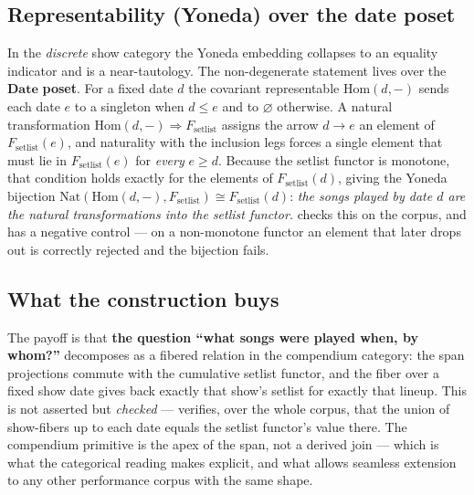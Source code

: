 \documentclass[
]{article}
\begin{document}
\subsection{Representability (Yoneda) over the date
poset}\label{representability-yoneda-over-the-date-poset}

In the \emph{discrete} show category the Yoneda embedding collapses to
an equality indicator and is a near-tautology. The non-degenerate
statement lives over the \(\mathbf{Date}\) \textbf{poset}. For a fixed
date \(d\) the covariant representable \(\mathrm{Hom}(d, -)\) sends each
date \(e\) to a singleton when \(d \le e\) and to \(\varnothing\)
otherwise. A natural transformation
\(\mathrm{Hom}(d, -) \Rightarrow F_{\text{setlist}}\) assigns the arrow
\(d \to e\) an element of \(F_{\text{setlist}}(e)\), and naturality with
the inclusion legs forces a single element that must lie in
\(F_{\text{setlist}}(e)\) for \emph{every} \(e \ge d\). Because the
setlist functor is monotone, that condition holds exactly for the
elements of \(F_{\text{setlist}}(d)\), giving the Yoneda bijection
\(\mathrm{Nat}(\mathrm{Hom}(d, -), F_{\text{setlist}}) \cong F_{\text{setlist}}(d)\):
\emph{the songs played by date \(d\) are the natural transformations
into the setlist functor.}
 checks
this on the corpus, and  has a negative
control --- on a non-monotone functor an element that later drops out is
correctly rejected and the bijection fails.

\subsection{What the construction
buys}\label{what-the-construction-buys}

The payoff is that \textbf{the question ``what songs were played when,
by whom?''} decomposes as a fibered relation in the compendium category:
the span projections commute with the cumulative setlist functor, and
the fiber over a fixed show date gives back exactly that show's setlist
for exactly that lineup. This is not asserted but \emph{checked} ---
verifies, over the whole corpus, that the union of show-fibers up to
each date equals the setlist functor's value there. The compendium
primitive is the apex of the span, not a derived join --- which is what
the categorical reading makes explicit, and what allows seamless
extension to any other performance corpus with the same shape.
\end{document}
